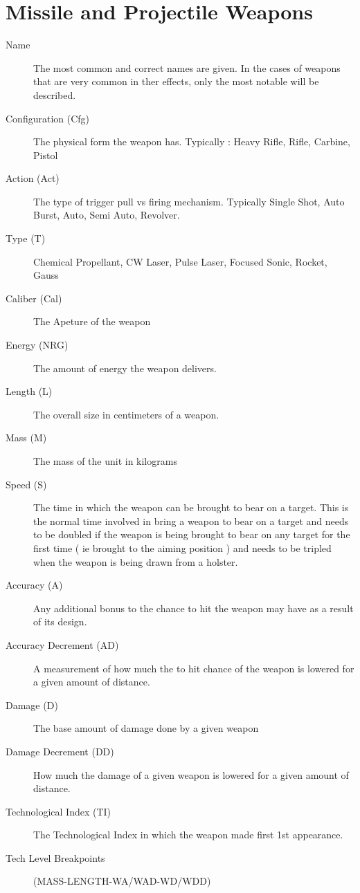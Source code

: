 \clearpage
\section{Missile and Projectile Weapons}

\begin{description}
	\item[Name]
	The most common and correct names are given. In the cases of weapons
	that are very common in ther effects, only the most notable will be
	described.
	\item[Configuration (Cfg)]
	The physical form the weapon has. Typically : Heavy Rifle, Rifle, 
	Carbine, Pistol 
	\item[Action (Act)]
	The type of trigger pull vs firing mechanism. Typically Single Shot, Auto Burst,
	Auto, Semi Auto, Revolver.
	\item[Type (T)]
	Chemical Propellant, CW Laser, Pulse Laser, Focused Sonic, Rocket, Gauss
	\item[Caliber (Cal)]
	The Apeture of the weapon
	\item[Energy (NRG)]
	The amount of energy the weapon delivers.
	\item[Length (L)]
	The overall size in centimeters of a weapon.
	\item[Mass (M)]
	The mass of the unit in kilograms
	\item[Speed (S)]
	The time in which the weapon can be brought to bear on a target. This is
	the normal time involved in bring a weapon to bear on a target and needs
	to be doubled if the weapon is being brought to bear on any target for
	the first time ( ie brought to the aiming position ) and needs to be tripled
	when the weapon is being drawn from a holster.
	\item[Accuracy (A)]
	Any ad\-di\-tional bonus to the chance to hit the weapon may have as a
	result of its design.
	\item[Accuracy Decrement (AD)]
	A measurement of how much the to hit chance of the weapon is lowered for
	a given amount of distance.
	\item[Damage (D)]
	The base amount of dam\-age done by a given weapon
	\item[Damage Decrement  (DD)]
	How much the damage of a given weapon is lowered for a given amount of
	distance.
	\item[Technological Index (TI)]
	The Technological Index in which the weapon made first 1st appearance.
	\item[Tech Level Breakpoints]
	(MASS-LENGTH-WA/WAD-WD/WDD)
\end{description}

